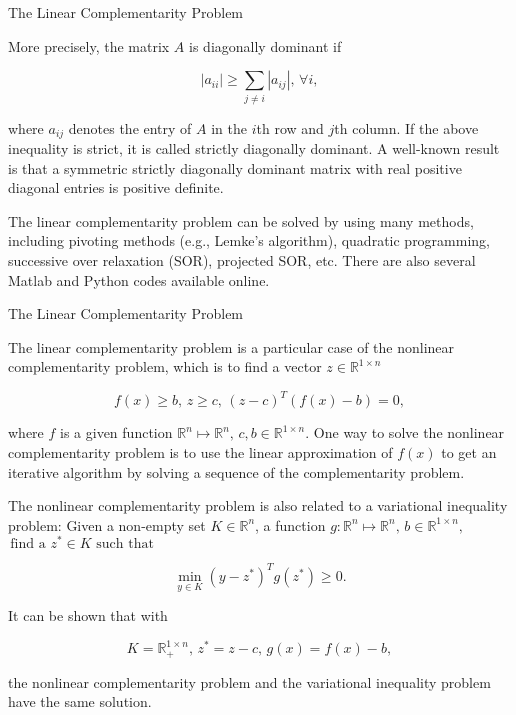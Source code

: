 \documentclass{beamer}
\begin{document}
\begin{frame}{The Linear Complementarity Problem}

    {\footnotesize \footnotesize
      More precisely, the matrix \( A \) is diagonally dominant if

    \[
    |a_{ii}| \geq \sum_{j \neq i} |a_{ij}|, \, \forall i,
    \]

    where \( a_{ij} \) denotes the entry of \( A \) in the \( i \)th row and \( j \)th column. 
    If the above inequality is strict, it is called strictly diagonally dominant. A well-known result is that a 
    symmetric strictly diagonally dominant matrix with real positive diagonal entries is positive definite.

    \vspace{1em}

     \pause The linear complementarity problem can be solved by using many methods, 
    including pivoting methods (e.g., Lemke's algorithm), quadratic programming, 
    successive over relaxation (SOR), projected SOR, etc. There are also several 
    Matlab and Python codes available online.

    }
    
\end{frame}


\begin{frame}{The Linear Complementarity Problem}

    {\footnotesize \footnotesize
     The linear complementarity problem is a particular case of the nonlinear complementarity problem, which is to find a vector \( z \in \mathbb{R}^{1 \times n} \)

\[
f(x) \geq b, \, z \geq c, \, (z - c)^T(f(x) - b) = 0,
\]

where \( f \) is a given function \( \mathbb{R}^n \longmapsto \mathbb{R}^n, \, c, b \in \mathbb{R}^{1 \times n} \). 
One way to solve the nonlinear complementarity problem is to use the linear approximation of \( f(x) \) to get
an iterative algorithm by solving a sequence of the complementarity problem.

\vspace{1em}
 \pause The nonlinear complementarity problem is also related to a variational inequality problem: 
Given a non-empty set \( K \in \mathbb{R}^n \), a function $g: \mathbb{R}^n \longmapsto \mathbb{R}^n, \, b \in \mathbb{R}^{1 \times n},$
\(  \, \text{find a } 
z^* \in K \text{ such that} \)

\[
\min_{y \in K}(y - z^*)^T g(z^*) \geq 0.
\]

It can be shown that with

\[
K = \mathbb{R}_+^{1 \times n}, \, z^* = z - c, \, g(x) = f(x) - b,
\]

the nonlinear complementarity problem and the variational inequality problem have the same solution.

    }
    
\end{frame}
\end{document}
